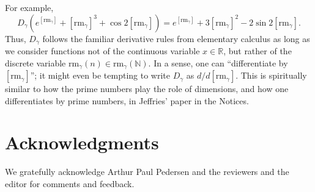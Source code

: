 \documentclass[microtype]{jloganal}
\def\RM{\mathrm{rm}}
\begin{document}
For example,
\[
    D_\gamma(e^{[\RM_\gamma]} + [\RM_\gamma]^3 + \cos2[\RM_\gamma])
    =
    e^{[\RM_\gamma]} + 3[\RM_\gamma]^2 - 2\sin2[\RM_\gamma].
\]
Thus, $D_\gamma$
follows the familiar derivative rules from
elementary calculus as long as we consider functions not of the
continuous variable $x\in\mathbb R$, but rather of the
discrete variable $\RM_\gamma(n)\in\RM_\gamma(\mathbb N)$.
In a sense, one can ``differentiate by $[\RM_\gamma]$'';
it might even be tempting to write $D_\gamma$ as $d/d[\RM_\gamma]$.
This is spiritually similar to how the prime numbers play the role of
dimensions, and how one differentiates by prime numbers,
in Jeffries' paper \cite{jeffries1772differentiating} in the Notices.



\section*{Acknowledgments}

We gratefully acknowledge Arthur Paul Pedersen
and the reviewers and the editor for comments and feedback.



\end{document}

